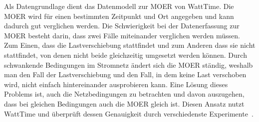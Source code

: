 Als Datengrundlage dient das Datenmodell zur \ac{MOER} von WattTime.
Die \ac{MOER} wird für einen bestimmten Zeitpunkt und Ort angegeben und kann dadurch gut verglichen werden.
Die Schwierigkeit bei der Datenerfassung zur \ac{MOER} besteht darin, dass zwei Fälle miteinander verglichen werden müssen.
Zum Einen, dass die Lastverschiebung stattfindet und zum Anderen dass sie nicht stattfindet, von denen nicht beide gleichzeitig umgesetzt werden können.
Durch schwankende Bedingungen im Stromnetz ändert sich die \ac{MOER} ständig, weshalb man den Fall der Lastverschiebung und den Fall, in dem keine Last verschoben wird, nicht einfach hintereinander ausprobieren kann.
Eine Lösung dieses Problems ist, auch die Netzbedingungen zu betrachten und davon auszugehen, dass bei gleichen Bedingungen auch die \ac{MOER} gleich ist.
Diesen Ansatz nutzt WattTime und überprüft dessen Genauigkeit durch verschiedenste Experimente~\cite{WattTime.2022}.

